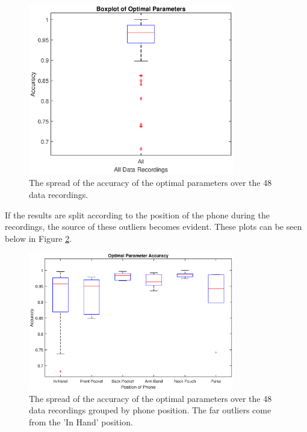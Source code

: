             \begin{figure}[!th]
                \includegraphics[width=0.8\textwidth]{Images/opt_params_overall.eps}
                \centering
                \caption{The spread of the accuracy of the optimal parameters over the 48 data recordings.}
                \label{img_opt_params_overall}
            \end{figure}

            If the results are split according to the position of the phone during the recordings, the source of these outliers becomes evident. These plots can be seen below in Figure \ref{img_opt_params_positions_bp}.

            \begin{figure}[!th]
                \includegraphics[width=0.8\textwidth]{Images/opt_params_positions_bp.eps}
                \centering
                \caption{The spread of the accuracy of the optimal parameters over the 48 data recordings grouped by phone position. The far outliers come from the 'In Hand' position.}
                \label{img_opt_params_positions_bp}
            \end{figure}

